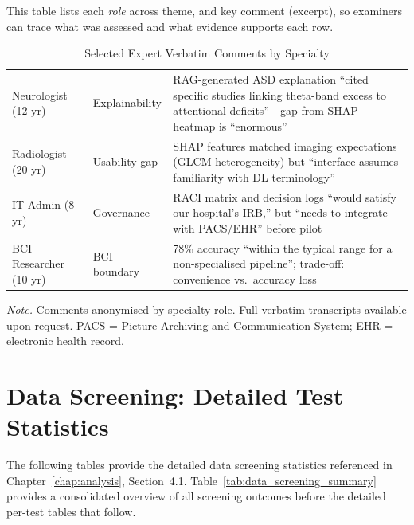 \noindent This table lists each \textit{role} across theme, and key comment (excerpt), so examiners can trace what was assessed and what evidence supports each row.



{\tablestripes\tablefontsize
{}
\begin{xltabular}{\textwidth}{@{} >{\raggedright\arraybackslash}p{3.3cm} >{\raggedright\arraybackslash}p{2.7cm} p{8.4cm} @{}}
\caption[Selected Expert Verbatim Comments by Specialty]{Selected Expert Verbatim Comments by Specialty}\label{tab:expert_comments} \\
\toprule
{} &  &  \\
\midrule
\endfirsthead
\endhead
\bottomrule
\endlastfoot
Neurologist (12 yr) & Explainability & RAG-generated ASD explanation ``cited specific studies linking theta-band excess to attentional deficits''---gap from SHAP heatmap is ``enormous'' \\
\addlinespace
Radiologist (20 yr) & Usability gap & SHAP features matched imaging expectations (GLCM heterogeneity) but ``interface assumes familiarity with DL terminology'' \\
\addlinespace
IT Admin (8 yr) & Governance & RACI matrix and decision logs ``would satisfy our hospital's IRB,'' but ``needs to integrate with PACS/EHR'' before pilot \\
\addlinespace
BCI Researcher (10 yr) & BCI boundary & 78\% accuracy ``within the typical range for a non-specialised pipeline''; trade-off: convenience vs.\ accuracy loss \\
\end{xltabular}}
\vspace{0.5em}\noindent\textit{Note.} Comments anonymised by specialty role. Full verbatim transcripts available upon request. PACS = Picture Archiving and Communication System; EHR = electronic health record.

\section{Data Screening: Detailed Test Statistics}
\label{app:data_screening_details}

The following tables provide the detailed data screening statistics referenced in Chapter~\ref{chap:analysis}, Section~4.1. Table~\ref{tab:data_screening_summary} provides a consolidated overview of all screening outcomes before the detailed per-test tables that follow.

